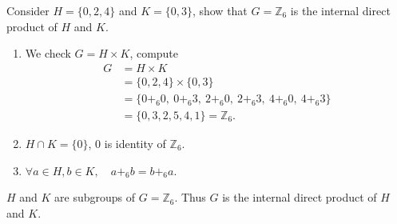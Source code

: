 \begin{example}
    Consider $H = \{ 0, 2, 4 \}$ and $K = \{0, 3\}$, show that $G = \mathbb{Z}_6$ is the internal direct product of $H$ and $K$.
\end{example}
\begin{solution}
    \begin{enumerate}
        \item We check $G = H \times K$, compute 
        \begin{align*}
            G &= H \times K\\
            &= \{ 0, 2, 4 \} \times \{ 0, 3\}\\
            &= \{ 0 +_6 0,\> 0 +_6 3,\> 2 +_6 0,\> 2 +_6 3,\> 4 +_6 0,\> 4 +_6 3\}\\
            &= \{ 0, 3, 2, 5, 4, 1 \} = \mathbb{Z}_6.
        \end{align*}
        \item $H \cap K = \{ 0 \}$, $0$ is identity of $\mathbb{Z}_6$.
        \item $\forall a \in H, b \in K, \quad a +_6 b = b+_6 a$.
    \end{enumerate}
    $H$ and $K$ are subgroups of $G = \mathbb{Z}_6$. Thus $G$ is the internal direct product of $H$ and $K$.
\end{solution}

